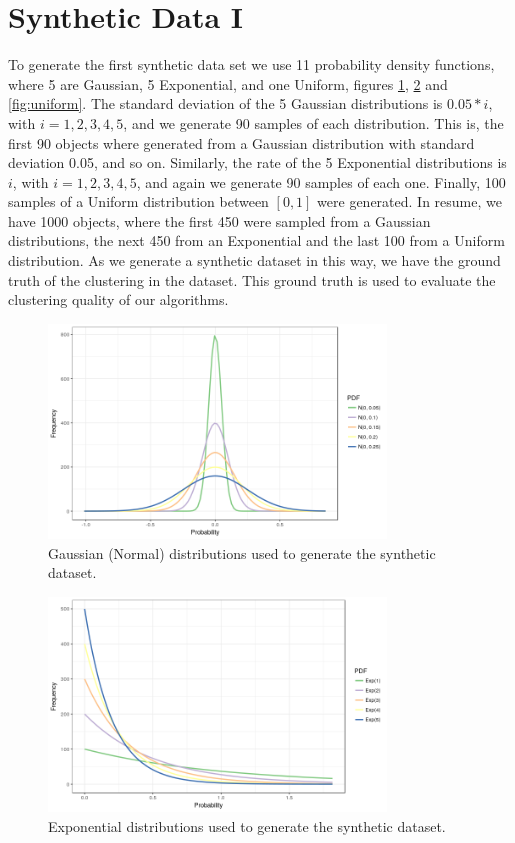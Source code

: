 \section{Synthetic Data I}\label{sec:synthetic_I}
To generate the first synthetic data set we use 11 probability density functions, where 5 are Gaussian, 5 Exponential, and one Uniform, figures \ref{fig:5_gaussian}, \ref{fig:5_exp} and \ref{fig:uniform}. The standard deviation of the 5 Gaussian distributions is $0.05*i$, with $i=1, 2, 3, 4, 5$, and we generate 90 samples of each distribution. This is, the first 90 objects where generated from a Gaussian distribution with standard deviation 0.05, and so on. Similarly, the rate of the 5 Exponential distributions is $i$, with $i=1, 2, 3, 4, 5$, and again we generate 90 samples of each one. Finally, 100 samples of a Uniform distribution between $[0, 1]$ were generated. In resume, we have 1000 objects, where the first 450 were sampled from a Gaussian distributions, the next 450 from an Exponential and the last 100 from a Uniform distribution. As we generate a synthetic dataset in this way, we have the ground truth of the clustering in the dataset. This ground truth is used to evaluate the clustering quality of our algorithms.

\begin{figure}[ht]
    \centering
    \includegraphics[width=0.8\textwidth]{img/gld_clustering/extra_images/5_gaussian.png}
    \caption{Gaussian (Normal) distributions used to generate the synthetic dataset.}
    \label{fig:5_gaussian}
\end{figure}

\begin{figure}[ht]
    \centering
    \includegraphics[width=0.8\textwidth]{img/gld_clustering/extra_images/5_exp.png}
    \caption{Exponential distributions used to generate the synthetic dataset.}
    \label{fig:5_exp}
\end{figure}

